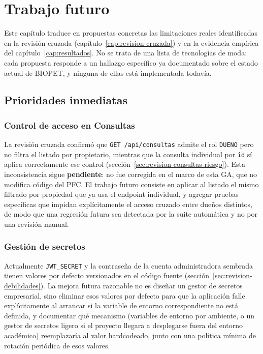 \chapter{Trabajo futuro}
\label{cap:trabajo-futuro}

Este cap\'itulo traduce en propuestas concretas las limitaciones reales
identificadas en la revisi\'on cruzada (cap\'itulo~\ref{cap:revision-cruzada})
y en la evidencia emp\'irica del cap\'itulo~\ref{cap:resultados}. No se trata
de una lista de tecnolog\'ias de moda: cada propuesta responde a un hallazgo
espec\'ifico ya documentado sobre el estado actual de BIOPET, y ninguna de
ellas est\'a implementada todav\'ia.

\section{Prioridades inmediatas}
\label{sec:futuro-prioridades-inmediatas}

\subsection{Control de acceso en Consultas}
\label{sec:futuro-consultas}

La revisi\'on cruzada confirm\'o que \texttt{GET~/api/consultas} admite el
rol \texttt{DUENO} pero no filtra el listado por propietario, mientras que
la consulta individual por \texttt{id} s\'i aplica correctamente ese control
(secci\'on~\ref{sec:revision-consultas-riesgo}). Esta inconsistencia sigue
\textbf{pendiente}: no fue corregida en el marco de esta GA, que no modifica
c\'odigo del PFC. El trabajo futuro consiste en aplicar al listado el mismo
filtrado por propiedad que ya usa el endpoint individual, y agregar pruebas
espec\'ificas que impidan expl\'icitamente el acceso cruzado entre due\~nos
distintos, de modo que una regresi\'on futura sea detectada por la suite
autom\'atica y no por una revisi\'on manual.

\subsection{Gesti\'on de secretos}
\label{sec:futuro-secretos}

Actualmente \texttt{JWT\_SECRET} y la contrase\~na de la cuenta
administradora sembrada tienen valores por defecto versionados en el
c\'odigo fuente (secci\'on~\ref{sec:revision-debilidades}). La mejora futura
razonable no es dise\~nar un gestor de secretos empresarial, sino eliminar
esos valores por defecto para que la aplicaci\'on falle expl\'icitamente al
arrancar si la variable de entorno correspondiente no est\'a definida, y
documentar qu\'e mecanismo (variables de entorno por ambiente, o un
gestor de secretos ligero si el proyecto llegara a desplegarse fuera del
entorno acad\'emico) reemplazar\'ia al valor hardcodeado, junto con una
pol\'itica m\'inima de rotaci\'on peri\'odica de esos valores.

